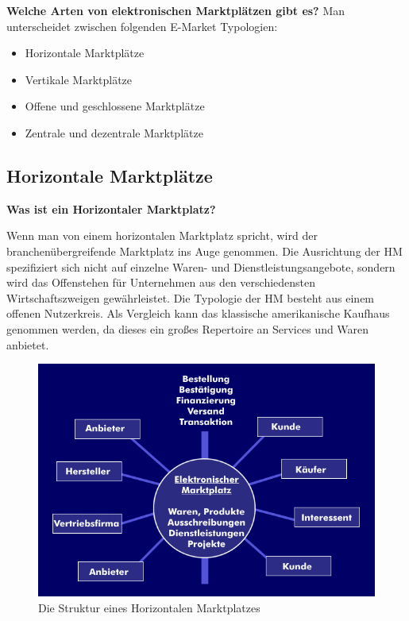 \documentclass[11pt,a4paper]{article}
\begin{document}
\textbf{Welche Arten von elektronischen Marktplätzen gibt es?}
\newline  \newline Man unterscheidet zwischen folgenden E-Market Typologien:

\begin{itemize}
	\item Horizontale Marktplätze
	\item Vertikale Marktplätze
	\item Offene und geschlossene Marktplätze
	\item Zentrale und dezentrale Marktplätze
\end{itemize}

\subsection{Horizontale Marktplätze}

\textbf{Was ist ein Horizontaler Marktplatz?} \newline

\noindent Wenn man von einem horizontalen Marktplatz spricht, wird der branchenübergreifende Marktplatz ins Auge genommen. Die Ausrichtung der HM spezifiziert sich nicht auf einzelne Waren- und Dienstleistungsangebote, sondern wird das Offenstehen für Unternehmen aus den verschiedensten Wirtschaftszweigen gewährleistet. Die Typologie der HM besteht aus einem offenen Nutzerkreis. \newline \newline Als Vergleich kann das klassische amerikanische Kaufhaus genommen werden, da dieses ein großes Repertoire an Services und Waren anbietet. \\

\begin{figure}[ht!]
	\centering
	\includegraphics[width=150mm]{hmarktplatz}
	\caption{Die Struktur eines Horizontalen Marktplatzes \label{hmarktplatz}}
\end{figure}
\end{document}
